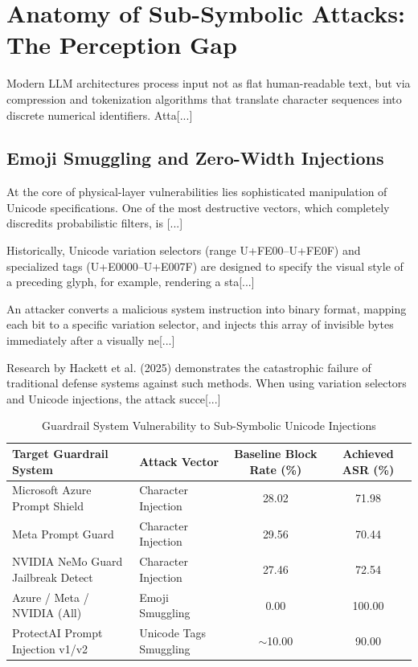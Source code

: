 \documentclass[10pt,a4paper]{article}
\begin{document}
\section{Anatomy of Sub-Symbolic Attacks: The Perception Gap}
Modern LLM architectures process input not as flat human-readable text, but via compression and tokenization algorithms that translate character sequences into discrete numerical identifiers. Atta[...]

\subsection{Emoji Smuggling and Zero-Width Injections}
At the core of physical-layer vulnerabilities lies sophisticated manipulation of Unicode specifications. One of the most destructive vectors, which completely discredits probabilistic filters, is [...]

Historically, Unicode variation selectors (range U+FE00--U+FE0F) and specialized tags (U+E0000--U+E007F) are designed to specify the visual style of a preceding glyph, for example, rendering a sta[...]

An attacker converts a malicious system instruction into binary format, mapping each bit to a specific variation selector, and injects this array of invisible bytes immediately after a visually ne[...]

Research by Hackett et al. (2025) demonstrates the catastrophic failure of traditional defense systems against such methods. When using variation selectors and Unicode injections, the attack succe[...]

\begin{table}[h!]
\centering
\caption{Guardrail System Vulnerability to Sub-Symbolic Unicode Injections}
\vspace{2mm}
\begin{tabularx}{\textwidth}{X X c c}
\toprule
\textbf{Target Guardrail System} & \textbf{Attack Vector} & \textbf{Baseline Block Rate (\%)} & \textbf{Achieved ASR (\%)} \\
\midrule
Microsoft Azure Prompt Shield & Character Injection & 28.02 & 71.98 \\
Meta Prompt Guard & Character Injection & 29.56 & 70.44 \\
NVIDIA NeMo Guard Jailbreak Detect & Character Injection & 27.46 & 72.54 \\
Azure / Meta / NVIDIA (All) & Emoji Smuggling & 0.00 & 100.00 \\
ProtectAI Prompt Injection v1/v2 & Unicode Tags Smuggling & $\sim$10.00 & 90.00 \\
\bottomrule
\end{tabularx}
\end{table}
\end{document}
